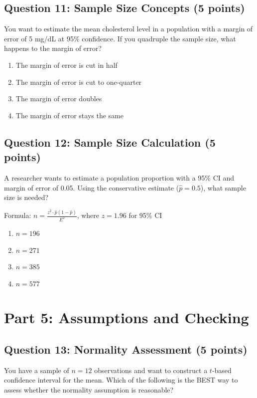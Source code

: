 \documentclass[11pt]{article}
\begin{document}
\subsection*{Question 11: Sample Size Concepts (5 points)}

You want to estimate the mean cholesterol level in a population with a margin of error of 5 mg/dL at 95\% confidence. If you quadruple the sample size, what happens to the margin of error?

\begin{enumerate}[label=\alph*)]
\item The margin of error is cut in half
\item The margin of error is cut to one-quarter
\item The margin of error doubles
\item The margin of error stays the same
\end{enumerate}

\subsection*{Question 12: Sample Size Calculation (5 points)}

A researcher wants to estimate a population proportion with a 95\% CI and margin of error of 0.05. Using the conservative estimate ($\hat{p} = 0.5$), what sample size is needed?

Formula: $n = \frac{z^2 \cdot \hat{p}(1-\hat{p})}{E^2}$, where $z = 1.96$ for 95\% CI

\begin{enumerate}[label=\alph*)]
\item $n = 196$
\item $n = 271$
\item $n = 385$
\item $n = 577$
\end{enumerate}

\section*{Part 5: Assumptions and Checking}

\subsection*{Question 13: Normality Assessment (5 points)}

You have a sample of $n = 12$ observations and want to construct a $t$-based confidence interval for the mean. Which of the following is the BEST way to assess whether the normality assumption is reasonable?
\end{document}
